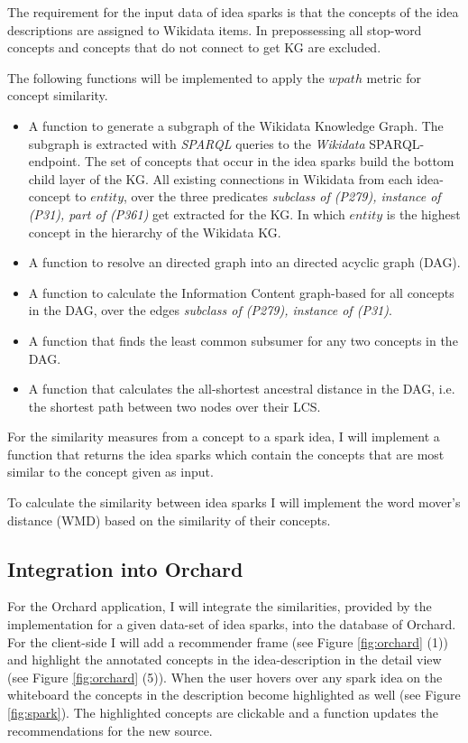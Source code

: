 \documentclass[pdftex,a4paper,12pt]{scrartcl}
\theoremstyle{definition}
\begin{document}
    The requirement for the input data of idea sparks is that the concepts of the idea descriptions are assigned to Wikidata items. In prepossessing all stop-word concepts and concepts that do not connect to get KG are excluded.
    
    The following functions will be implemented to apply the $wpath$ metric for concept similarity.
    \begin{itemize}
        \item A function to generate a subgraph of the Wikidata Knowledge Graph.
        The subgraph is extracted with \textit{SPARQL} queries to the \textit{Wikidata} SPARQL-endpoint. The set of concepts that occur in the idea sparks build the bottom child layer of the KG. All existing connections in Wikidata from each idea-concept to $entity$, over the three predicates \textit{subclass of (P279), instance of (P31), part of (P361)} get extracted for the KG. In which $entity$ is the highest concept in the hierarchy of the Wikidata KG. 
        \item A function to resolve an directed graph into an directed acyclic graph (DAG). 
        \item A function to calculate the Information Content graph-based for all concepts in the DAG, over the edges \textit{subclass of (P279), instance of (P31)}. 
        \item A function that finds the least common subsumer for any two concepts in the DAG.
        \item A function that calculates the all-shortest ancestral distance in the DAG, i.e. the shortest path between two nodes over their LCS. 
    \end{itemize}
    
    For the similarity measures from a concept to a spark idea, I will implement a function that returns the idea sparks which contain the concepts that are most similar to the concept given as input. 
    
    To calculate the similarity between idea sparks I will implement the word mover's distance (WMD) \citep{kusner_word_nodate} based on the similarity of their concepts. 
    
    \subsection{Integration into Orchard}
    
    For the Orchard application, I will integrate the similarities, provided by the implementation for a given data-set of idea sparks, into the database of Orchard. 
    For the client-side I will add a recommender frame (see Figure \ref{fig:orchard} (1)) and highlight the annotated concepts in the idea-description in the detail view (see Figure \ref{fig:orchard} (5)). When the user hovers over any spark idea on the whiteboard the concepts in the description become highlighted as well (see Figure \ref{fig:spark}). The highlighted concepts are clickable and a function updates the recommendations for the new source. 
    
\end{document}
